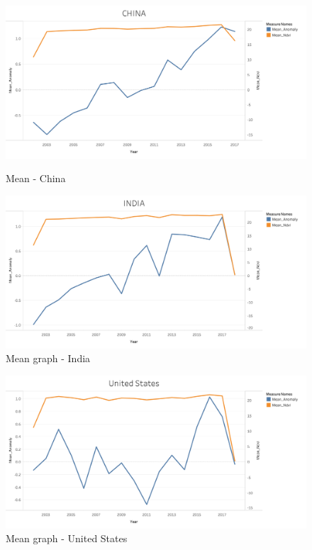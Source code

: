 \begin{itemize}
     \begin{figure}[!htb]
        \begin{minipage}{0.5\textwidth}
            \centering
            \includegraphics[width=1.0\linewidth]{figures/ch5/Mean/CHINA_mean.png}
            \caption{Mean - China}\label{Fig:CHINA_mean}
        \end{minipage}\hfill
        \begin{minipage}{0.5\textwidth}
            \centering
            \includegraphics[width=1.0\linewidth]{figures/ch5/Mean/INDIA_mean.png}
            \caption{Mean graph - India}\label{Fig:INDIA_mean}
        \end{minipage}
    \end{figure}
    
     \begin{figure}[H]
            \centering
            \includegraphics[width=0.5\linewidth]{figures/ch5/Mean/US_mean.png}
            \caption{\label{fig:US_mean}Mean graph - United States}
    \end{figure}


\end{itemize}
